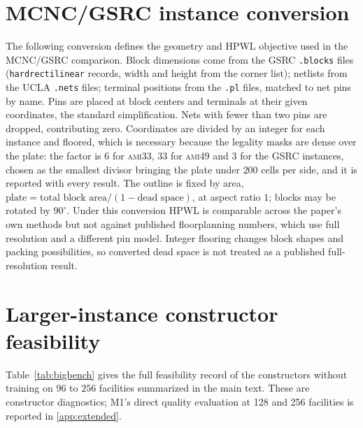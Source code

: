 \documentclass[11pt]{article}
\begin{document}
\section{MCNC/GSRC instance conversion}
\label{app:conversion}
The following conversion defines the geometry and HPWL objective used in
the MCNC/GSRC comparison. Block
dimensions come from the GSRC \texttt{.blocks} files
(\texttt{hardrectilinear} records, width and height from the corner list);
netlists from the UCLA \texttt{.nets} files; terminal positions from the
\texttt{.pl} files, matched to net pins by name. Pins are placed at block centers and
terminals at their given coordinates, the standard simplification. Nets with
fewer than two pins are dropped, contributing zero. Coordinates are divided by
an integer for each instance and floored, which is necessary because the legality
masks are dense over the plate: the factor is $6$ for \textsc{ami33}, $33$
for \textsc{ami49} and $3$ for the GSRC instances, chosen as the smallest
divisor bringing the plate under $200$ cells per side, and it is reported with
every result. The outline is fixed by area,
$\text{plate}=\text{total block area}/(1-\text{dead space})$, at aspect
ratio $1$; blocks may be rotated by $90^\circ$. Under this conversion HPWL is
comparable across the paper's own methods but not against published
floorplanning numbers, which use full resolution and a different pin model.
Integer flooring changes block shapes and packing possibilities, so converted
dead space is not treated as a published full-resolution result.

\section{Larger-instance constructor feasibility}
\label{app:bigbench}
Table~\ref{tab:bigbench} gives the full feasibility record of the
constructors without training on $96$ to $256$ facilities summarized in the main
text. These are constructor diagnostics; M1's direct quality evaluation at
128 and 256 facilities is reported in \ref{app:extended}.
\end{document}
